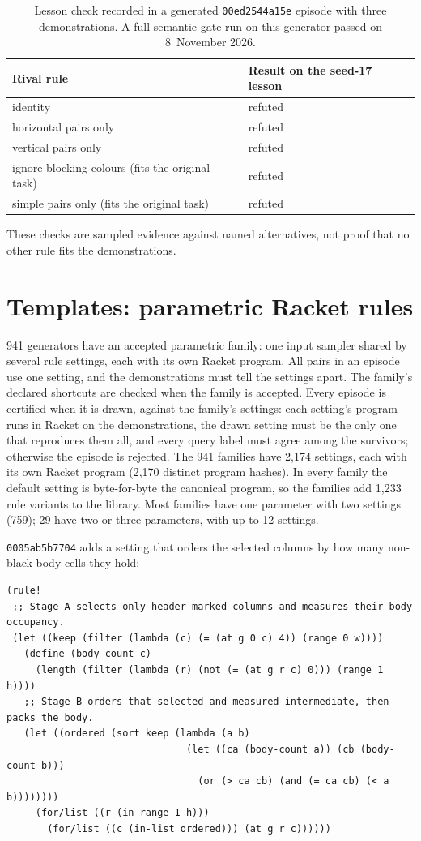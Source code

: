 \documentclass[11pt]{article}
\newcommand{\gen}[1]{\texttt{#1}}
\begin{document}
\begin{table}[H]
\centering
\begin{tabular}{ll}
\toprule
Rival rule & Result on the seed-17 lesson \\
\midrule
identity & refuted \\
horizontal pairs only & refuted \\
vertical pairs only & refuted \\
ignore blocking colours (fits the original task) & refuted \\
simple pairs only (fits the original task) & refuted \\
\bottomrule
\end{tabular}
\caption{Lesson check recorded in a generated \gen{00ed2544a15e} episode with
three demonstrations. A full semantic-gate run on this generator passed on
8~November 2026.}
\end{table}

These checks are sampled evidence against named alternatives, not proof that no
other rule fits the demonstrations.

\section{Templates: parametric Racket rules}
\label{sec:parametric}

941 generators have an accepted parametric family: one input sampler shared by
several rule settings, each with its own Racket program. All pairs in an episode
use one setting, and the demonstrations must tell the settings apart. The
family's declared shortcuts are checked when the family is accepted. Every
episode is certified when it is drawn, against the family's settings:
each setting's program runs in Racket on the demonstrations, the drawn setting
must be the only one that reproduces them all, and every query label must agree
among the survivors; otherwise the episode is rejected. The 941 families have 2,174 settings, each with its own Racket
program (2,170 distinct program hashes). In every family the default setting is
byte-for-byte the canonical program, so the families add 1,233 rule variants to
the library. Most families have one parameter with two settings (759); 29 have
two or three parameters, with up to 12 settings.

\gen{0005ab5b7704} adds a setting that orders the selected columns by how many
non-black body cells they hold:

\begin{lstlisting}[language=Racket]
(rule!
 ;; Stage A selects only header-marked columns and measures their body occupancy.
 (let ((keep (filter (lambda (c) (= (at g 0 c) 4)) (range 0 w))))
   (define (body-count c)
     (length (filter (lambda (r) (not (= (at g r c) 0))) (range 1 h))))
   ;; Stage B orders that selected-and-measured intermediate, then packs the body.
   (let ((ordered (sort keep (lambda (a b)
                               (let ((ca (body-count a)) (cb (body-count b)))
                                 (or (> ca cb) (and (= ca cb) (< a b))))))))
     (for/list ((r (in-range 1 h)))
       (for/list ((c (in-list ordered))) (at g r c))))))
\end{lstlisting}
\end{document}
